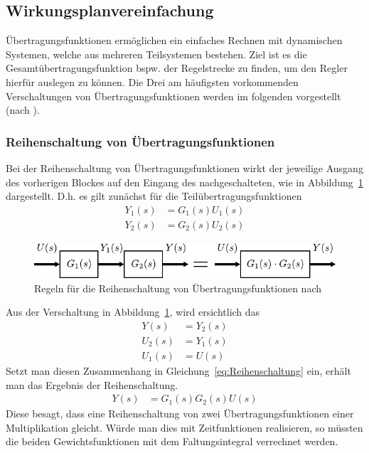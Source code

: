 \subsection{Wirkungsplanvereinfachung}
%
Übertragungsfunktionen ermöglichen ein einfaches Rechnen mit dynamischen Systemen, welche aus mehreren Teilsystemen bestehen. Ziel ist es die Gesamtübertragungsfunktion bspw. der Regelstrecke zu finden, um den Regler hierfür auslegen zu können. Die Drei am häufigsten vorkommenden Verschaltungen von Übertragungsfunktionen werden im folgenden vorgestellt (nach \cite{Lunze10}).
%
\subsubsection{Reihenschaltung von Übertragungsfunktionen}
%
Bei der Reihenschaltung von Übertragungsfunktionen wirkt der jeweilige Ausgang des vorherigen Blockes auf den Eingang des nachgeschalteten, wie in Abbildung~\ref{fig:Reiheschaltung} dargestellt. D.h. es gilt zunächst für die Teilübertragungsfunktionen
%
\begin{equation}
\begin{aligned}
%
Y_{1}(s)&=G_{1}(s)U_{1}(s)\\
Y_{2}(s)&=G_{2}(s)U_{2}(s)\label{eq:Reihenschaltung}
%
\end{aligned}
\end{equation} 
%
\begin{figure}
	\centering
	\includegraphics[width=0.85\linewidth]{Abbildungen/Modellbildung/PDF/RechenregelnMult.pdf}
	\caption{Regeln für die Reihenschaltung von Übertragungsfunktionen nach \cite{Lunze10}}
	\label{fig:Reiheschaltung}
\end{figure}
%
Aus der Verschaltung in Abbildung~\ref{fig:Reiheschaltung}, wird ersichtlich das
%
\begin{equation*}
\begin{aligned}
%
Y(s)&=Y_{2}(s)\\
U_{2}(s)&=Y_{1}(s)\\
U_{1}(s)&=U(s)
%
\end{aligned}
\end{equation*} 
%
Setzt man diesen Zusammenhang in Gleichung~\ref{eq:Reihenschaltung} ein, erhält man das Ergebnis der Reihenschaltung.
%
\begin{equation*}
\begin{aligned}
%
Y(s)&=G_{1}(s)G_{2}(s)U(s)
%
\end{aligned}
\end{equation*} 
%
Diese besagt, dass eine Reihenschaltung von zwei Übertragungsfunktionen einer Multiplikation gleicht. Würde man dies mit Zeitfunktionen realisieren, so müssten die beiden Gewichtsfunktionen mit dem Faltungsintegral verrechnet werden.
%
